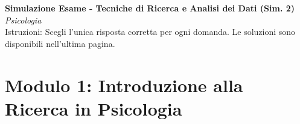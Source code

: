 \documentclass[12pt, a4paper]{article}
\begin{document}
\begin{center}
    \Large\textbf{Simulazione Esame - Tecniche di Ricerca e Analisi dei Dati (Sim. 2)} \\
    \vspace{0.2cm}
    \large\textit{Psicologia} \\
    \vspace{0.5cm}
    \normalsize{Istruzioni: Scegli l'unica risposta corretta per ogni domanda. Le soluzioni sono disponibili nell'ultima pagina.}
\end{center}
\vspace{1cm}

\section*{Modulo 1: Introduzione alla Ricerca in Psicologia}
\end{document}
